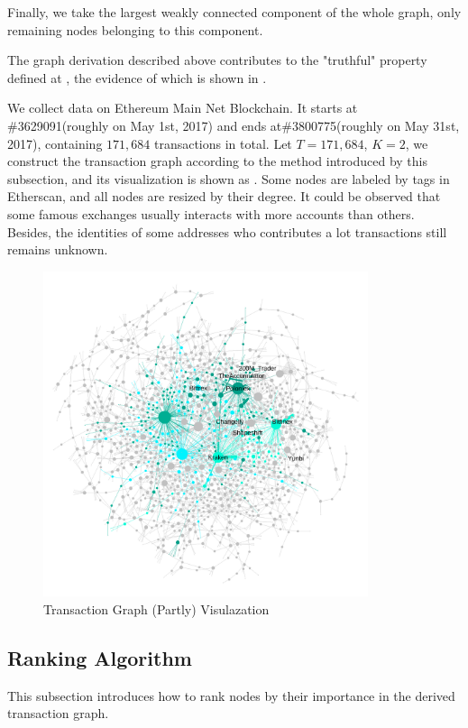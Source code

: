 Finally, we take the largest weakly connected component of the whole graph, only remaining nodes belonging to this component.

The graph derivation described above contributes to the "truthful" property defined at , the evidence of which is shown in .

We collect data on Ethereum Main Net Blockchain. It starts at \#3629091(roughly on May 1st, 2017) and ends at\#3800775(roughly on May 31st, 2017), containing $171,684$ transactions in total. Let $T=171,684$, $K=2$, we construct the transaction graph according to the method introduced by this subsection, and its visualization is shown as . Some nodes are labeled by tags in Etherscan\cite{etherscan}, and all nodes are resized by their degree. It could be observed that some famous exchanges usually interacts with more accounts than others. Besides, the identities of some addresses who contributes a lot transactions still remains unknown. 

\begin{figure}[h]
	\centering
	\includegraphics[width=0.85\textwidth]{figs/wgc1.png}
	\caption{Transaction Graph (Partly) Visulazation }\label{fig:wgc}
\end{figure}

\subsection{Ranking Algorithm} \label{subsec:leaderrank}
This subsection introduces how to rank nodes by their importance in the derived transaction graph.

